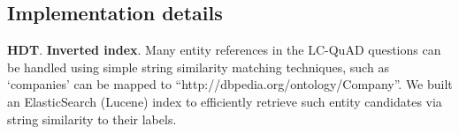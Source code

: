 






\subsection{Implementation details}
\label{sec:implementation}
\textbf{HDT}.
%
\textbf{Inverted index}. Many entity references in the LC-QuAD questions can be handled using simple string similarity matching techniques, such as `companies' can be mapped to ``http://dbpedia.org/ontology/Company''.
We built an ElasticSearch (Lucene) index to efficiently retrieve such entity candidates via string similarity to their labels.

